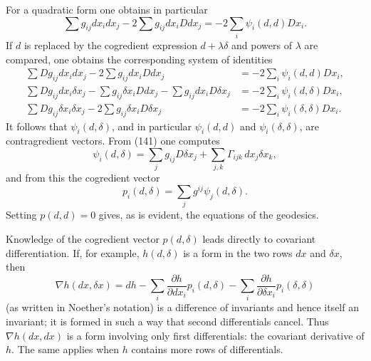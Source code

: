 \documentclass[11pt]{article}
\begin{document}
For a quadratic form one obtains in particular
\[
  \sum g_{ij}dx_i dx_j -2\sum g_{ij}dx_iDdx_j=-2\sum_i \psi_i(d,d)Dx_i.
\]
If $d$ is replaced by the cogredient expression $d+\lambda\delta$ and powers of $\lambda$ are compared, one obtains the corresponding system of identities
\begin{align*}
  \sum Dg_{ij}dx_i dx_j -2\sum g_{ij}dx_iDdx_j &=-2\sum_i\psi_i(d,d)Dx_i,\tag{141a}\\
  \sum Dg_{ij}dx_i\delta x_j-\sum g_{ij}\delta x_iDdx_j-\sum g_{ij}dx_iD\delta x_j &=-2\sum_i\psi_i(d,\delta)Dx_i,\tag{141b}\\
  \sum Dg_{ij}\delta x_i\delta x_j-2\sum g_{ij}\delta x_iD\delta x_j &=-2\sum_i\psi_i(\delta,\delta)Dx_i.\tag{141c}
\end{align*}
It follows that $\psi_i(d,\delta)$, and in particular $\psi_i(d,d)$ and $\psi_i(\delta,\delta)$, are contragredient vectors. From (141) one computes
\[
  \psi_i(d,\delta)=\sum_j g_{ij}D\delta x_j+\sum_{j,k}\Gamma_{ijk}\,dx_j\delta x_k,
\]
and from this the cogredient vector
\begin{equation}
  p_i(d,\delta)=\sum_j g^{ij}\psi_j(d,\delta).                   \tag{142}
\end{equation}
Setting $p(d,d)=0$ gives, as is evident, the equations of the geodesics.

Knowledge of the cogredient vector $p(d,\delta)$ leads directly to covariant differentiation. If, for example, $h(d,\delta)$ is a form in the two rows $dx$ and $\delta x$, then
\begin{equation}
  \nabla h(dx,\delta x)=dh-\sum_i \frac{\partial h}{\partial dx_i}p_i(d,\delta)-\sum_i\frac{\partial h}{\partial \delta x_i}p_i(\delta,\delta)            \tag{143}
\end{equation}
(as written in Noether's notation) is a difference of invariants and hence itself an invariant; it is formed in such a way that second differentials cancel. Thus $\nabla h(dx,dx)$ is a form involving only first differentials: the covariant derivative of $h$. The same applies when $h$ contains more rows of differentials.
\end{document}
